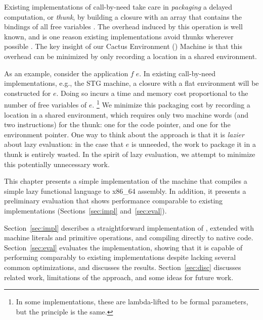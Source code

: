 Existing implementations of call-by-need take care in \emph{packaging} a delayed
computation, or \emph{thunk}, by building a closure with an array that contains
the bindings of all free variables \cite{jonesstg,boquist1997grin}. The overhead
induced by this operation is well known, and is one reason existing
implementations avoid thunks wherever possible \cite{johnsson1984efficient}. The
key insight of our Cactus Environment (\ce) Machine is that this overhead can be
minimized by only recording a location in a shared environment.

As an example, consider the application $f \; e$. In existing call-by-need
implementations, e.g., the STG machine\cite{jonesstg}, a closure with a flat
environment will be constructed for $e$.  Doing so incurs a time and memory cost
proportional to the number of free variables of $e$. \footnote{In some
implementations, these are lambda-lifted to be formal parameters, but the
principle is the same.} We minimize this packaging cost by recording a
location in a shared environment, which requires only two
machine words (and two instructions) for the thunk: one for the code pointer,
and one for the environment pointer. One way to think about the approach is that
it is \emph{lazier} about lazy evaluation: in the case that $e$ is unneeded, the
work to package it in a thunk is entirely wasted. In the spirit of lazy
evaluation, we attempt to minimize this potentially unnecessary work.  

This chapter presents a simple implementation of the \ce machine that
compiles a simple lazy functional language to x86\_64 assembly. In addition, it
presents a preliminary evaluation that shows performance comparable to existing
implementations (Sections~\ref{sec:impl} and~\ref{sec:eval}). 

Section~\ref{sec:impl} describes a straightforward implementation of \ce,
extended with machine literals and primitive operations, and compiling directly
to native code. Section~\ref{sec:eval} evaluates the implementation, showing
that it is capable of performing comparably to existing implementations despite
lacking several common optimizations, and discusses the results.
Section~\ref{sec:disc} discusses related work, limitations of the approach, and
some ideas for future work.
